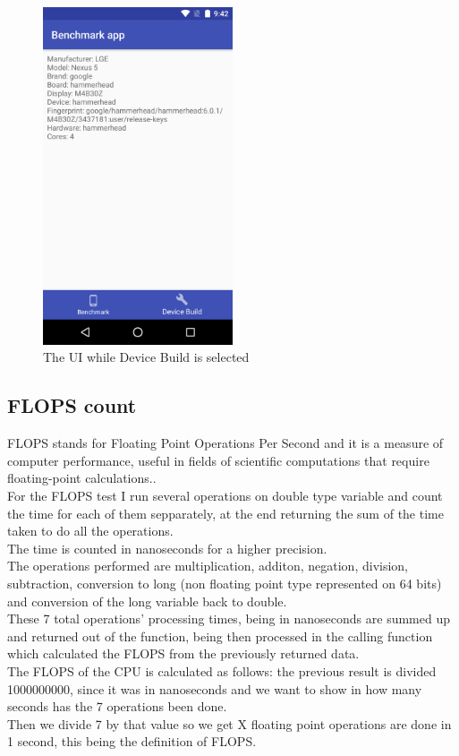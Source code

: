 \documentclass[a4paper,10pt]{report}
\begin{document}
 \begin{figure}[h]
  \centering
  \includegraphics[width=0.5\textwidth]{Screenshot_20180523-214209.png}
  \caption{The UI while Device Build is selected}
  \label{fig:uiBuild}
  
 \end{figure}
 
 \subsection{FLOPS count}
 FLOPS stands for Floating Point Operations Per Second and it is a measure of computer performance, useful in fields of scientific computations that require floating-point calculations..\\
 For the FLOPS test I run several operations on double type variable and count the time for each of them sepparately, at the end returning the sum of the time taken to do all the operations.\\
 The time is counted in nanoseconds for a higher precision.\\
 The operations performed are multiplication, additon, negation, division, subtraction, conversion to long (non floating point type represented on 64 bits) and conversion of the long variable back to double.\\
 These 7 total operations' processing times, being in nanoseconds are summed up and returned out of the function, being then processed in the calling function which calculated the FLOPS from the previously returned data.\\
 The FLOPS of the CPU is calculated as follows: the previous result is divided 1000000000, since it was in nanoseconds and we want to show in how many seconds has the 7 operations been done.\\
 Then we divide 7 by that value so we get X floating point operations are done in 1 second, this being the definition of FLOPS.\\
 
\end{document}
